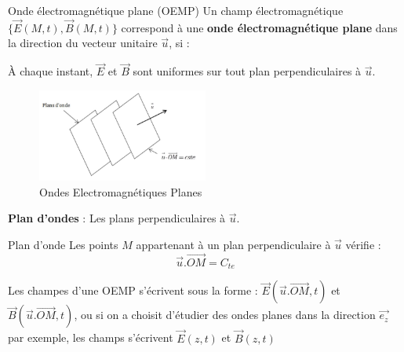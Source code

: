 \begin{Definition}[colbacktitle=red!75!black]{Onde électromagnétique plane (OEMP)}{}
    Un champ électromagnétique $\{ \overrightarrow{E} (M,t), \overrightarrow{B} (M,t)\}$ correspond à une \textbf{onde électromagnétique plane} dans la direction du vecteur unitaire $\overrightarrow{u}$, si :
    \begin{center}
    À chaque instant, $\overrightarrow{E} $ et $\overrightarrow{B} $ sont uniformes sur tout plan perpendiculaires à $\overrightarrow{u} $.
    \end{center}

    \begin{figure}[H] %
        \centering
        \includegraphics[width=0.5\textwidth]{./assets/Ondes Electromagnétiques Planes.png}
        \caption{Ondes Electromagnétiques Planes}
        \label{fig:Ondes-Electromagnétiques-Planes}
    \end{figure}

    \textbf{Plan d'ondes} : Les plans perpendiculaires à $\overrightarrow{u}$.
\end{Definition}

\begin{Prop}{Plan d'onde}{}
Les points $M$ appartenant à un plan perpendiculaire à $\overrightarrow{u}$ vérifie :
\[
  \overrightarrow{u}. \overrightarrow{OM} = C_{te}
\]

Les champes d'une OEMP s'écrivent sous la forme : $\overrightarrow{E} (\overrightarrow{u} .\overrightarrow{OM} ,t)$ et $\overrightarrow{B} (\overrightarrow{u} .\overrightarrow{OM} ,t)$, ou si on a choisit d'étudier des ondes planes dans la direction $\overrightarrow{e_z} $ par exemple, les champs s'écrivent $\overrightarrow{E} (z,t)$ et $\overrightarrow{B} (z,t)$
\end{Prop}



